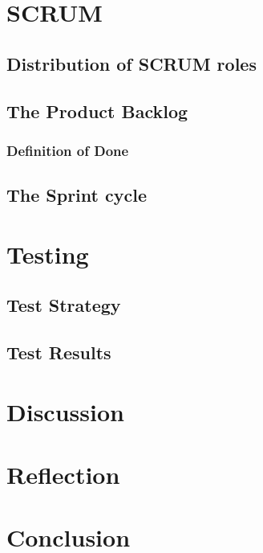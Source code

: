 \documentclass[a4paper,11pt]{article}
\begin{document}
\pagebreak
\section{SCRUM}


\subsection{Distribution of SCRUM roles}


\subsection{The Product Backlog}


\subsubsection{Definition of Done}


\subsection{The Sprint cycle}


\pagebreak
\section{Testing}


\subsection{Test Strategy}


\subsection{Test Results}


\pagebreak
\section{Discussion}


\pagebreak
\section{Reflection}


\pagebreak
\section{Conclusion}


\pagebreak


\pagebreak
\appendix

\end{document}
